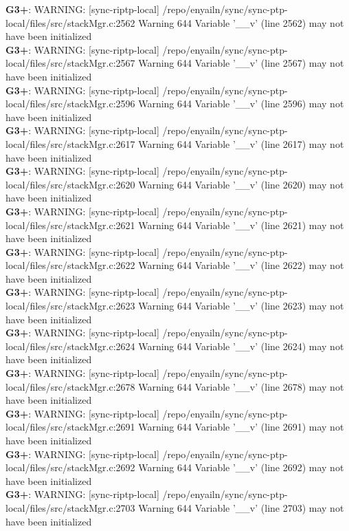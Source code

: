 \documentclass[12pt,twoside]{article}
\begin{document}
\textbf{G3+}: WARNING: [sync-riptp-local] /repo/enyailn/sync/sync-ptp-local/files/src/stackMgr.c:2562 Warning 644 Variable '\_\_v' (line 2562) may not have been initialized\\ 
\textbf{G3+}: WARNING: [sync-riptp-local] /repo/enyailn/sync/sync-ptp-local/files/src/stackMgr.c:2567 Warning 644 Variable '\_\_v' (line 2567) may not have been initialized\\ 
\textbf{G3+}: WARNING: [sync-riptp-local] /repo/enyailn/sync/sync-ptp-local/files/src/stackMgr.c:2596 Warning 644 Variable '\_\_v' (line 2596) may not have been initialized\\ 
\textbf{G3+}: WARNING: [sync-riptp-local] /repo/enyailn/sync/sync-ptp-local/files/src/stackMgr.c:2617 Warning 644 Variable '\_\_v' (line 2617) may not have been initialized\\ 
\textbf{G3+}: WARNING: [sync-riptp-local] /repo/enyailn/sync/sync-ptp-local/files/src/stackMgr.c:2620 Warning 644 Variable '\_\_v' (line 2620) may not have been initialized\\ 
\textbf{G3+}: WARNING: [sync-riptp-local] /repo/enyailn/sync/sync-ptp-local/files/src/stackMgr.c:2621 Warning 644 Variable '\_\_v' (line 2621) may not have been initialized\\ 
\textbf{G3+}: WARNING: [sync-riptp-local] /repo/enyailn/sync/sync-ptp-local/files/src/stackMgr.c:2622 Warning 644 Variable '\_\_v' (line 2622) may not have been initialized\\ 
\textbf{G3+}: WARNING: [sync-riptp-local] /repo/enyailn/sync/sync-ptp-local/files/src/stackMgr.c:2623 Warning 644 Variable '\_\_v' (line 2623) may not have been initialized\\ 
\textbf{G3+}: WARNING: [sync-riptp-local] /repo/enyailn/sync/sync-ptp-local/files/src/stackMgr.c:2624 Warning 644 Variable '\_\_v' (line 2624) may not have been initialized\\ 
\textbf{G3+}: WARNING: [sync-riptp-local] /repo/enyailn/sync/sync-ptp-local/files/src/stackMgr.c:2678 Warning 644 Variable '\_\_v' (line 2678) may not have been initialized\\ 
\textbf{G3+}: WARNING: [sync-riptp-local] /repo/enyailn/sync/sync-ptp-local/files/src/stackMgr.c:2691 Warning 644 Variable '\_\_v' (line 2691) may not have been initialized\\ 
\textbf{G3+}: WARNING: [sync-riptp-local] /repo/enyailn/sync/sync-ptp-local/files/src/stackMgr.c:2692 Warning 644 Variable '\_\_v' (line 2692) may not have been initialized\\ 
\textbf{G3+}: WARNING: [sync-riptp-local] /repo/enyailn/sync/sync-ptp-local/files/src/stackMgr.c:2703 Warning 644 Variable '\_\_v' (line 2703) may not have been initialized\\ 
\end{document}
